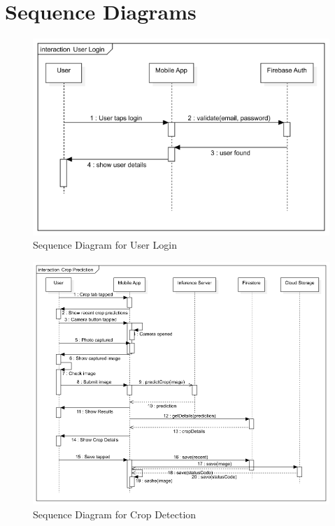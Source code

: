 \documentclass[../Report.tex]{subfiles}
\begin{document}
\section{Sequence Diagrams}
\begin{figure}[H]
    \centering
    \includegraphics[width=0.9\linewidth]{images/seq_user_login.png}
    \caption{Sequence Diagram for User Login}
    \label{fig:seq_1}
\end{figure}

\begin{figure}[H]
    \centering
    \includegraphics[width=\linewidth]{images/seq_crop.png}
    \caption{Sequence Diagram for Crop Detection}
    \label{fig:seq_2}
\end{figure}
\end{document}
